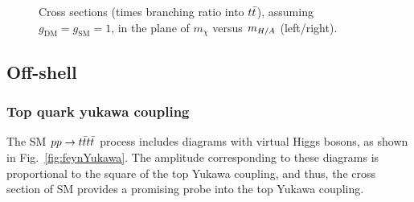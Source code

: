 \begin{figure}[htb!]
    \centering
\caption{Cross sections (times branching ratio into $t\bar{t}$), assuming
$g_\mathrm{DM}=g_\mathrm{SM}=1$, in the plane of $m_\chi$ versus $m_{H/A}$ (left/right).
}
\label{fig:dm_2d_xsecs}
\end{figure}



\FloatBarrier

\subsection{Off-shell}

\subsubsection{Top quark yukawa coupling}

The SM $pp \rightarrow t\bar{t}t\bar{t}$ process includes diagrams with virtual Higgs bosons,
as shown in Fig.~\ref{fig:feynYukawa}. 
The amplitude corresponding to these diagrams is 
proportional to the square of the top Yukawa coupling,
and thus, the cross section of SM \tttt provides
a promising probe into the top Yukawa coupling.

